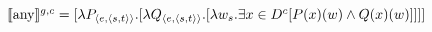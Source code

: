 $\intension[g,c]{any}=[\lambda{P_{\langle e,\langle s,t\rangle\rangle}}.[\lambda{Q_{\langle e,\langle s,t\rangle\rangle}}.[\lambda{w_s}.\exists{x\in D^c}[P(x)(w)\land Q(x)(w)]]]]$